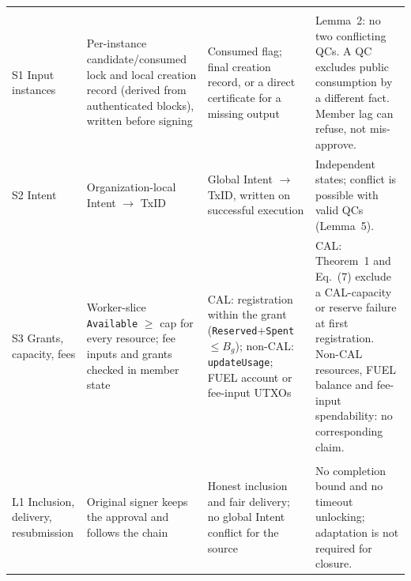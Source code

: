 \begin{table}[!t]
\begin{tabularx}{\textwidth}{@{}>{\raggedright\arraybackslash}p{2.6cm}YYY@{}}
\hline
{} \\
S1 Input instances
 & Per-instance candidate/consumed lock and local creation record (derived from authenticated blocks), written before signing
 & Consumed flag; final creation record, or a direct certificate for a missing output
 & Lemma~2: no two conflicting QCs. A QC excludes public consumption by a different fact. Member lag can refuse, not mis-approve. \\
S2 Intent
 & Organization-local Intent $\to$ TxID
 & Global Intent $\to$ TxID, written on successful execution
 & Independent states; conflict is possible with valid QCs (Lemma~5). \\
S3 Grants, capacity, fees
 & Worker-slice \texttt{Available} $\ge$ cap for every resource; fee inputs and grants checked in member state
 & CAL: registration within the grant (\texttt{Reserved}+\texttt{Spent} $\le B_g$); non-CAL: \texttt{updateUsage}; FUEL account or fee-input UTXOs
 & CAL: Theorem~1 and Eq.~(7) exclude a CAL-capacity or reserve failure at first registration. Non-CAL resources, FUEL balance and fee-input spendability: no corresponding claim. \\
\hline
{} \\
L1 Inclusion, delivery, resubmission
 & Original signer keeps the approval and follows the chain
 & Honest inclusion and fair delivery; no global Intent conflict for the source
 & No completion bound and no timeout unlocking; adaptation is not required for closure. \\
\hline
\end{tabularx}
\end{table}
 
